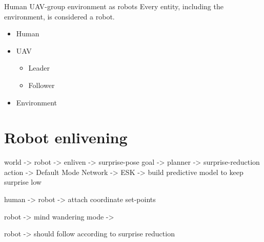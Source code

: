 \begin{frame}[allowframebreaks]{Human UAV-group environment as robots}
    Every entity, including the environment, is considered a robot.
    \begin{itemize}
        \item Human
        \item UAV
        \begin{itemize}
            \item Leader
            \item Follower
        \end{itemize}
        \item Environment
    \end{itemize}
    
    
    \section{Robot enlivening}
        world -> robot -> enliven -> surprise-pose goal -> planner -> surprise-reduction action -> Default Mode Network -> ESK -> build predictive model to keep surprise low
        
        human -> robot -> attach coordinate set-points
        
        robot -> mind wandering mode \cite{mason-2007-wandering-minds-the-default-network-and-stimulus-independent-thought} ->
        
        robot -> should follow according to surprise reduction
\end{frame}